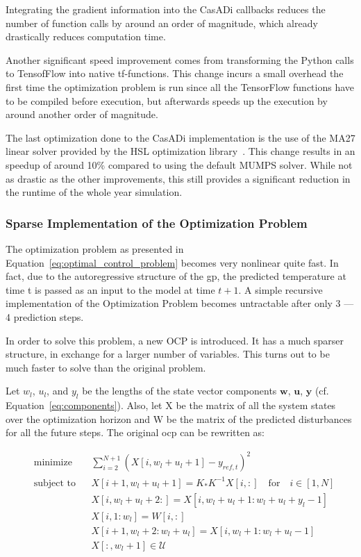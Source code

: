 Integrating the gradient information into the CasADi callbacks reduces the
number of function calls by around an order of magnitude, which already
drastically reduces computation time.

Another significant speed improvement comes from transforming the Python calls
to TensofFlow into native tf-functions. This change incurs a small overhead the
first time the optimization problem is run since all the TensorFlow functions
have to be compiled before execution, but afterwards speeds up the execution by
around another order of magnitude.

The last optimization done to the CasADi implementation is the use of the MA27
linear solver provided by the HSL optimization
library~\cite{HSLCollectionFortran}. This change results in an speedup of around
10\% compared to using the default MUMPS solver. While not as drastic as the
other improvements, this still provides a significant reduction in the runtime
of the whole year simulation.

\subsubsection{Sparse Implementation of the Optimization Problem}

The optimization problem as presented in
Equation~\ref{eq:optimal_control_problem} becomes very nonlinear quite fast. In
fact, due to the autoregressive structure of the \acrshort{gp}, the predicted
temperature at time t is passed as an input to the model at time $t+1$. A simple
recursive implementation of the Optimization Problem becomes untractable after
only 3 --- 4 prediction steps. 

In order to solve this problem, a new OCP is introduced. It has a much sparser
structure, in exchange for a larger number of variables. This turns out to be
much faster to solve than the original problem.

Let $w_l$, $u_l$, and $y_l$ be the lengths of the state vector components
$\mathbf{w}$, $\mathbf{u}$, $\mathbf{y}$ (cf. Equation~\ref{eq:components}).
Also, let X be the matrix of all the system states over the optimization horizon
and W be the matrix of the predicted disturbances for all the future steps. The
original \acrlong{ocp} can be rewritten as:

\begin{subequations}\label{eq:sparse_optimal_control_problem}
    \begin{align}
        & \text{minimize}
        & & \sum_{i=2}^{N + 1} \left(X[i, w_l + u_l + 1] - y_{ref, t}\right)^2 \\
        & \text{subject to}
        & & X[i+1, w_l + u_l + 1] = K_*K^{-1}X[i, :] \quad \text{for} \quad
        i\in[1, N]\\
        &&& X[i, w_l + u_l + 2: ] = X[i, w_l+ u_l + 1: w_l + u_l + y_l - 1]\\
        &&& X[i, 1:w_l] = W[i, :] \\
        &&& X[i+1, w_l + 2: w_l + u_l] = X[i, w_l + 1: w_l + u_l - 1] \\
        &&& X[:, w_l + 1] \in \mathcal{U}
    \end{align}
\end{subequations}

